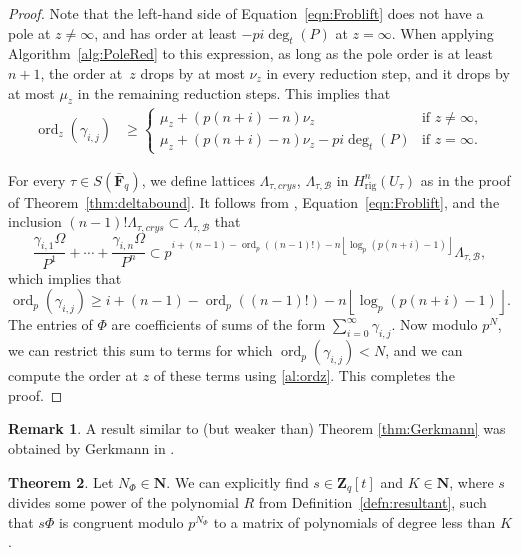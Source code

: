 \documentclass[a4paper,11pt]{article}
\numberwithin{equation}{section}
\providecommand{\floor}[1]{\left\lfloor#1\right\rfloor}   %
\newcommand{\NN}{\mathbf{N}} %
\newcommand{\ZZ}{\mathbf{Z}} %
\newcommand{\FF}{\mathbf{F}} %
\DeclareMathOperator{\ord}{ord}          %
\providecommand{\Hrig}{H_{\text{rig}}}  %
\providecommand{\cB}{\mathcal{B}} %
\theoremstyle{definition}
\newtheorem{thm}{Theorem}[section]
\newtheorem{rem}[thm]{Remark}
\begin{document}
\begin{proof}
Note that the left-hand side of Equation~\eqref{eqn:Froblift} does not have a 
pole at $z \neq \infty$, and has order at least $-pi\deg_t(P)$ at $z=\infty$. 
When applying Algorithm~\ref{alg:PoleRed} to this expression, as long as the 
pole order is at least~$n+1$, the order at~$z$ drops by at most $\nu_z$ in every 
reduction step, and it drops by at most $\mu_z$ in the remaining reduction steps. 
This implies that
\begin{align} \label{al:ordz}
\ord_z(\gamma_{i,j}) &\geq 
\begin{cases}
\mu_z + (p(n+i)-n) \nu_z                 &\mbox{if } z \neq \infty, \\
\mu_z + (p(n+i)-n) \nu_z - pi \deg_t(P)  &\mbox{if } z=\infty.
\end{cases}
\end{align}

For every $\tau \in S(\bar{\FF}_q)$, we
define lattices $\Lambda_{\tau,crys}$, $\Lambda_{\tau,\cB}$ in $\Hrig^n(U_{\tau})$
as in the proof of Theorem~\ref{thm:deltabound}. It follows from
\citep[Proposition 3.4.6]{AbbottKedlayaRoe2006}, Equation~\eqref{eqn:Froblift}, 
and the inclusion $(n-1)!\Lambda_{\tau,crys} \subset \Lambda_{\tau,\cB}$ that
\begin{equation*}
\frac{\gamma_{i,1} \Omega}{P^1}+\dotsb+\frac{\gamma_{i,n} \Omega}{P^n} \subset 
p^{i+(n-1)-\ord_p((n-1)!)-n \floor{\log_p(p(n+i)-1)}} \Lambda_{\tau,\cB},
\end{equation*}
which implies that
\begin{equation*}
\ord_p(\gamma_{i,j}) \geq i+(n-1) - \ord_p((n-1)!) - n \floor{\log_p(p(n+i)-1)}.
\end{equation*}
The entries of $\Phi$ are coefficients of sums of the form 
$\sum_{i=0}^{\infty} \gamma_{i,j}$. Now modulo $p^N$, we can 
restrict this sum to terms for which $\ord_p(\gamma_{i,j})<N$,
and we can compute the order at $z$ of these terms using
\eqref{al:ordz}. This completes the proof.
\end{proof}

\begin{rem}
A result similar to (but weaker than) Theorem \ref{thm:Gerkmann} 
was obtained by Gerkmann in \citep[Section 6]{Gerkmann2007}.
\end{rem}

\begin{thm} \label{thm:defD}
Let $N_{\Phi} \in \NN$. We can explicitly find $s \in \ZZ_q[t]$ and $K \in \NN$, 
where $s$ divides some power of the polynomial $R$ from Definition~\ref{defn:resultant}, such that 
$s \Phi$ is congruent modulo $p^{N_{\Phi}}$ to a matrix of polynomials of degree 
less than $K$. 
\end{thm}
\end{document}
